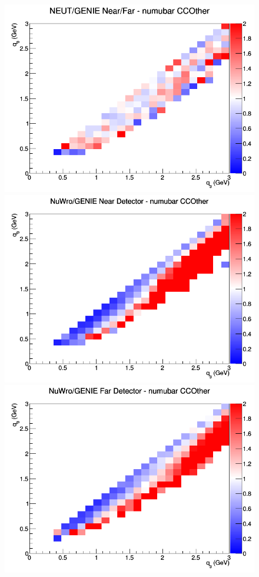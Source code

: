 \begin{figure}[h]
\endminipage
{}
\includegraphics[width=\linewidth]{q0_q3/nominal/ratios/CCOther_NEUT_GENIE_numubar_NF_q3_q0.png}
\endminipage
\newline
{}
\includegraphics[width=\linewidth]{q0_q3/nominal/ratios/CCOther_NuWro_GENIE_numubar_near_q3_q0.png}
\endminipage
{}
\includegraphics[width=\linewidth]{q0_q3/nominal/ratios/CCOther_NuWro_GENIE_numubar_far_q3_q0.png}

\end{figure}
